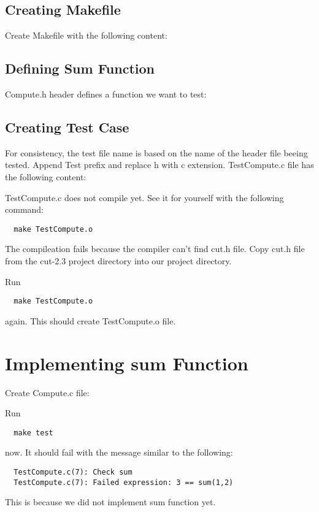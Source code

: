 \documentclass[a4paper,12pt]{article}
\begin{document}
\subsection{Creating Makefile}

Create Makefile with the following content:



\subsection{Defining Sum Function}

Compute.h header defines a function we want to test:



\subsection{Creating Test Case}

For consistency, the test file name is based on the name of the header
file beeing tested.  Append Test prefix and replace h with c
extension.  TestCompute.c file has the following content:



TestCompute.c does not compile yet.  See it for yourself with the
following command:
\begin{verbatim}
  make TestCompute.o
\end{verbatim}
The compileation fails because the compiler can't find cut.h file.
Copy cut.h file from the cut-2.3 project directory into our project
directory.

Run 
\begin{verbatim}
  make TestCompute.o
\end{verbatim}
again.  This should create TestCompute.o file.

\section{Implementing sum Function}

Create Compute.c file:



Run 
\begin{verbatim}
  make test 
\end{verbatim}
now.  It should fail with the message similar to the following:
\begin{verbatim}
  TestCompute.c(7): Check sum
  TestCompute.c(7): Failed expression: 3 == sum(1,2)
\end{verbatim}
This is because we did not implement sum function yet.
\end{document}
